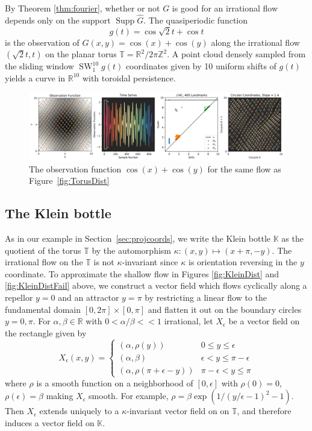 \documentclass[11pt]{article}
\theoremstyle{definition}
\theoremstyle{remark}
\newcommand{\RR}{\mathbb{R}}
\newcommand{\ZZ}{\mathbb{Z}}
\newcommand{\KK}{\mathbb{K}}
\newcommand{\TT}{\mathbb{T}}
\DeclareMathOperator{\SW}{SW}
\DeclareMathOperator{\Supp}{Supp}
\begin{document}
    By Theorem \ref{thm:fourier}, whether or not $G$ is good for an irrational flow depends only on the support $\Supp\hat{G}$. The quasiperiodic function
    \begin{equation}
    \label{eq:torusirrationalexample}
    g(t) = \cos \sqrt{2} t  + \cos t
    \end{equation}
    is the observation of $G(x,y) = \cos(x)+\cos(y)$ along the irrational flow $(\sqrt2t, t)$ on the planar torus $\TT=\RR^2/2\pi\ZZ^2$. A point cloud densely sampled from the sliding window $\SW_1^{10}g(t)$ coordinates given by 10 uniform shifts of $g(t)$ yields a curve in $\RR^{10}$ with toroidal persistence.
    \begin{figure}[!htb]
        \centering
        \includegraphics[width=\textwidth]{TorusFourier_400.png}
        \caption{The observation function $\cos(x) + \cos(y)$ for the same flow as Figure~\ref{fig:TorusDist}}
    \end{figure}



    \subsection{The Klein bottle}
    \label{sec:kleinbottle}

    As in our example in Section~\ref{sec:projcoords}, we write the Klein bottle $\KK$ as the quotient of the torus $\TT$ by the automorphism $\kappa: (x,y) \mapsto (x+\pi, -y)$. The irrational flow on the $\TT$ is not $\kappa$-invariant since $\kappa$ is orientation reversing in the $y$ coordinate. To approximate the shallow flow in Figures \ref{fig:KleinDist} and \ref{fig:KleinDistFail} above, we construct a vector field which flows cyclically along a repellor $y=0$ and an attractor $y=\pi$ by restricting a linear flow to the fundamental domain $[0,2\pi]\times[0, \pi]$ and flatten it out on the boundary circles $y=0, \pi$. For $\alpha,\beta\in \RR$ with $0 < \alpha/\beta<<1$ irrational, let $X_\epsilon$ be a vector field on the rectangle given by
    \[ X_\epsilon(x,y)= \begin{cases}
        (\alpha, \rho(y)) & 0 \leq y \leq \epsilon\\
        (\alpha, \beta) & \epsilon < y \leq \pi-\epsilon \\
        (\alpha, \rho(\pi+\epsilon-y)) & \pi-\epsilon < y \leq \pi
    \end{cases}
    \]
    where $\rho$ is a smooth function on a neighborhood of $[0, \epsilon]$ with $\rho(0) = 0$, $\rho(\epsilon) = \beta$ making $X_\epsilon$ smooth. For example, $\rho = \beta\exp(1/(y/\epsilon-1)^2-1)$. Then $X_\epsilon$ extends uniquely to a $\kappa$-invariant vector field on on $\TT$, and therefore induces a vector field on $\KK$.
\end{document}
